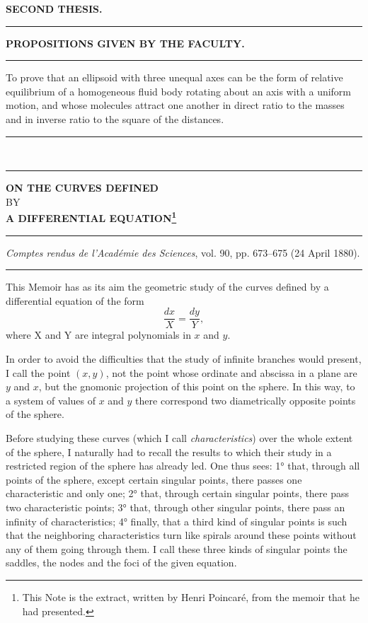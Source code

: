 \documentclass[11pt]{article}
\newcommand{\ornament}{\begin{center}\rule{2.5em}{0.4pt}\,\raisebox{0.1ex}{\tiny$\bullet\bullet\bullet$}\,\rule{2.5em}{0.4pt}\end{center}}
\newcommand{\shortline}{\begin{center}\rule{3.5em}{0.4pt}\end{center}}
\begin{document}
\renewcommand{\thefootnote}{(\arabic{footnote})}
\begin{center}
{\bfseries SECOND THESIS.}
\end{center}

\shortline

\begin{center}
{\Large\bfseries PROPOSITIONS GIVEN BY THE FACULTY.}
\end{center}

\shortline

To prove that an ellipsoid with three unequal axes can be the form of relative equilibrium of a homogeneous fluid body rotating about an axis with a uniform motion, and whose molecules attract one another in direct ratio to the masses and in inverse ratio to the square of the distances.

\ornament

\clearpage

\begin{center}
{\Large\bfseries ON THE CURVES DEFINED}\\[1.2em]
{\small BY}\\[1.2em]
{\large\bfseries A DIFFERENTIAL EQUATION\footnote{This Note is the extract, written by Henri Poincaré, from the memoir that he had presented.}}
\end{center}

\shortline

\begin{center}
\emph{Comptes rendus de l’Académie des Sciences}, vol. 90, pp. 673--675 (24 April 1880).
\end{center}

\shortline

This Memoir has as its aim the geometric study of the curves defined by a differential equation of the form
\[
\frac{dx}{X}=\frac{dy}{Y},
\]
where X and Y are integral polynomials in $x$ and $y$.

In order to avoid the difficulties that the study of infinite branches would present, I call the point $(x,y)$, not the point whose ordinate and abscissa in a plane are $y$ and $x$, but the gnomonic projection of this point on the sphere. In this way, to a system of values of $x$ and $y$ there correspond two diametrically opposite points of the sphere.

Before studying these curves (which I call \emph{characteristics}) over the whole extent of the sphere, I naturally had to recall the results to which their study in a restricted region of the sphere has already led. One thus sees: 1° that, through all points of the sphere, except certain singular points, there passes one characteristic and only one; 2° that, through certain singular points, there pass two characteristic points; 3° that, through other singular points, there pass an infinity of characteristics; 4° finally, that a third kind of singular points is such that the neighboring characteristics turn like spirals around these points without any of them going through them. I call these three kinds of singular points the saddles, the nodes and the foci of the given equation.
\end{document}
